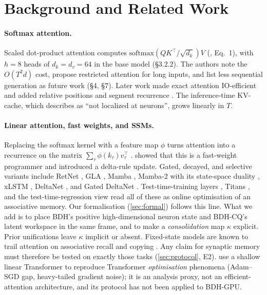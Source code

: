 \documentclass[11pt]{article}
\theoremstyle{remark}
\begin{document}
\section{Background and Related Work}
\label{sec:related}

\paragraph{Softmax attention.} Scaled dot-product attention computes
$\mathrm{softmax}(QK^\top/\sqrt{d_k})V$ (\citealp{vaswani2017attention}, Eq.~1), with $h=8$ heads of
$d_k=d_v=64$ in the base model (\S3.2.2). The authors note the $O(T^2d)$ cost, propose restricted attention for
long inputs, and list less sequential generation as future work (\S4, \S7). Later work made exact attention
IO-efficient \citep{dao2022flashattention} and added relative positions \citep{su2024roformer,press2022alibi} and
segment recurrence \citep{dai2019transformerxl}. The inference-time KV-cache, which \citet[Table~3]{kosowski2025bdh}
describes as ``not localized at neurons'', grows linearly in $T$.

\paragraph{Linear attention, fast weights, and SSMs.} Replacing the softmax kernel with a feature map $\phi$ turns
attention into a recurrence on the matrix $\sum_\tau \phi(k_\tau)v_\tau^\top$ \citep{katharopoulos2020transformers,
choromanski2021performer}. \citet{schlag2021linear} showed that this is a fast-weight programmer
\citep{ba2016fastweights} and introduced a delta-rule update. Gated, decayed, and selective variants include RetNet
\citep{sun2023retnet}, GLA \citep{yang2024gla}, Mamba \citep{gu2023mamba}, Mamba-2 with its state-space duality
\citep{dao2024ssd}, xLSTM \citep{beck2024xlstm}, DeltaNet \citep{yang2024deltanet}, and Gated DeltaNet
\citep{yang2025gateddelta}. Test-time-training layers \citep{sun2024ttt}, Titans \citep{behrouz2025titans}, and
the test-time-regression view \citep{wang2025testtimeregression} read all of these as online optimisation of an
associative memory. Our formalisation (\cref{sec:formal}) follows this line. What we add is to place BDH's
positive high-dimensional neuron state and BDH-CQ's latent workspace in the same frame, and to make a
\emph{consolidation} map $\kappa$ explicit. Prior unifications leave $\kappa$ implicit or absent. Fixed-state models
are known to trail attention on associative recall and copying \citep{arora2023zoology,jelassi2024repeat}. Any
claim for synaptic memory must therefore be tested on exactly those tasks (\cref{sec:protocol}, E2).
\citet{ahn2024linear} use a shallow linear Transformer to reproduce Transformer \emph{optimisation} phenomena
(Adam--SGD gap, heavy-tailed gradient noise); it is an analysis proxy, not an efficient-attention architecture, and
its protocol has not been applied to BDH-GPU.
\end{document}
